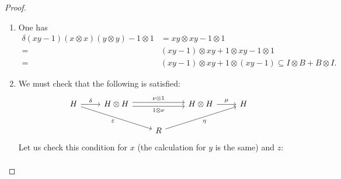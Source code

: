 \documentclass[8pt]{article}
\theoremstyle{definition}
\theoremstyle{definition}
\theoremstyle{definition}
\theoremstyle{definition}
\theoremstyle{definition}
\theoremstyle{definition}
\theoremstyle{definition}
\theoremstyle{definition}
\theoremstyle{definition}
\theoremstyle{definition}
\theoremstyle{definition}
\theoremstyle{definition}
\theoremstyle{definition}
\theoremstyle{definition}
\theoremstyle{question}
\begin{document}
\begin{proof}
\begin{enumerate}
\begin{align*}
      &= (1 \otimes \delta)(x \otimes x) = (1 \otimes \delta) \delta(x)
    \end{align*}
    The coassociativity for $z$:
    \begin{align*}
      (\delta \otimes 1) \delta(x) &= (\delta \otimes 1) (1 \otimes z + z \otimes x) \\
      &= 1 \otimes 1 \otimes z + (1 \otimes z + z \otimes x) \otimes x \\
      &= 1 \otimes (1 \otimes z + z \otimes x) + z \otimes x \otimes x \\
      &= (1 \otimes \delta)(1 \otimes z + z \otimes x) = (1 \otimes \delta)\delta(z)
    \end{align*}
    The counit conditions for $x$ (and similarly for $y$) and for $z$:
    \begin{align*}
      (\varepsilon \otimes 1) \delta(x) &= (\varepsilon \otimes 1) (x \otimes x) = \varepsilon(x)(x) = x \\
      &= (1 \otimes \varepsilon)(x \otimes x) = (1 \otimes \varepsilon) \delta(x).
    \end{align*}
    \begin{align*}
      (\varepsilon \otimes 1) \delta(z) &= (\varepsilon \otimes 1)(1 \otimes z + z \otimes x) = z + 0x = z \\
      &= 0 + z = (\varepsilon \otimes 1)(1 \otimes z + z \otimes x)  = (\varepsilon \otimes 1) \delta(z)
    \end{align*}
    \item One has
    \begin{align*}
      \delta(xy - 1)(x \otimes x)(y \otimes y) - 1 \otimes 1 &= xy \otimes xy - 1 \otimes 1 \\
      =& (xy - 1) \otimes xy + 1 \otimes xy - 1 \otimes 1 \\
      =& (xy - 1) \otimes xy + 1 \otimes (xy - 1) \subseteq I \otimes B + B \otimes I.
    \end{align*}
    \item We must check that the following is satisfied:
    \[
    \begin{tikzcd}
      H \ar[r, "\delta"] \ar[drr, "\varepsilon"'] & H \otimes H \ar[rr, shift left, "\nu \otimes 1"] \ar[rr, shift right, "1 \otimes \nu"']  && H \otimes H \ar[r, "\mu"] & H \\
      && R \ar[urr, "\eta"']
    \end{tikzcd}
    \]
    Let us check this condition for $x$ (the calculation for $y$ is the same) and $z$:
    \begin{align*}

\end{align*}
\end{enumerate}
\end{proof}
\end{document}
